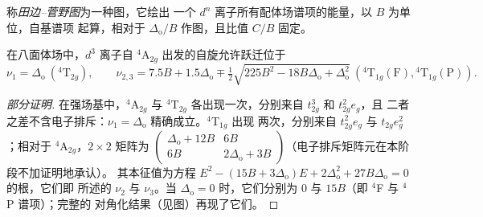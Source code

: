 \begin{definition}[田边–菅野图]\label{def:b3:complex-spectra-magnetism:tanabe-sugano}
称\emph{田边–菅野图}为一种图，它绘出
一个 $d^n$ 离子所有配体场谱项的能量，以 $B$ 为单位，自基谱项
起算，相对于 $\Delta_{\mathrm o}/B$ 作图，且比值 $C/B$ 固定。
\end{definition}

\begin{proposition}[$d^3$ 离子的三个吸收带]\label{prop:b3:complex-spectra-magnetism:d3-bands}
在八面体场中，$d^3$ 离子自 $^4$A$_{2g}$ 出发的自旋允许跃迁位于
\[
  \nu_1 = \Delta_{\mathrm o}\ (^4\mathrm T_{2g}), \qquad
  \nu_{2,3} = 7.5B + 1.5\Delta_{\mathrm o} \mp \tfrac12\sqrt{225B^2 - 18B\Delta_{\mathrm o} + \Delta_{\mathrm o}^2}\ (^4\mathrm T_{1g}(\mathrm F), {}^4\mathrm T_{1g}(\mathrm P)).
\]
\end{proposition}

\begin{proof}[部分证明]
在强场基中，$^4$A$_{2g}$ 与 $^4$T$_{2g}$ 各出现一次，分别来自 $t_{2g}^3$ 和 $t_{2g}^2e_g$，且
二者之差不含电子排斥：$\nu_1 = \Delta_{\mathrm o}$ 精确成立。$^4$T$_{1g}$ 出现
两次，分别来自 $t_{2g}^2e_g$ 与 $t_{2g}e_g^2$；相对于 $^4$A$_{2g}$，$2\times2$ 矩阵为
$\begin{pmatrix}\Delta_{\mathrm o} + 12B & 6B\\ 6B & 2\Delta_{\mathrm o} + 3B\end{pmatrix}$（电子排斥矩阵元在本阶段不加证明地承认）。
其本征值为方程 $E^2 - (15B + 3\Delta_{\mathrm o})E + 2\Delta_{\mathrm o}^2 + 27B\Delta_{\mathrm o} = 0$ 的根，它们即
所述的 $\nu_2$ 与 $\nu_3$。当 $\Delta_{\mathrm o} = 0$ 时，它们分别为 0 与 $15B$（即 $^4$F 与 $^4$P 谱项）；完整的
对角化结果（见图）再现了它们。
\end{proof}

